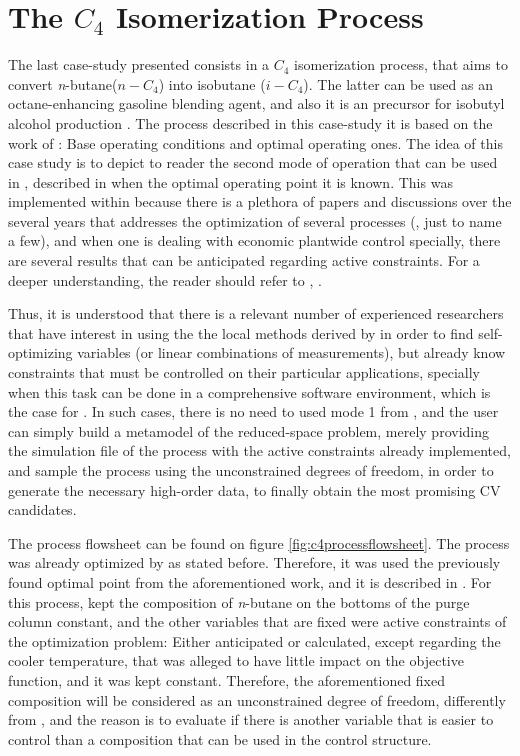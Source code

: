 \documentclass[../../msc-thesis.tex]{subfiles}
\begin{document}
\section{The $C_{4}$ Isomerization Process}

The last case-study presented consists in a $C_{4}$ isomerization process, 
that aims to convert \textit{n}-butane($n-C_{4}$) into isobutane ($i-C_{4}$). 
The latter can be used as an octane-enhancing gasoline blending agent, and 
also it is an precursor for isobutyl alcohol production 
\textcite{Jagtap2012}. The process described in this case-study it is based 
on the work of \cite{Jagtap2012}: Base operating conditions and optimal 
operating ones. The idea of this case study is to depict to reader the second
mode of operation that can be used in \mtc, described in 
 when the optimal operating point it is known. 
This was implemented within \mtc because there is a plethora of papers and 
discussions over the several years that addresses the optimization of several
processes (\cite{Jagtap2012,Jagtap2013,Araujo2007,Araujo2008,Gera2013,Liu2019,
Skogestad2004}, just to name a few), and when one is dealing with economic 
plantwide control specially, there are several results that can be anticipated 
regarding active constraints. For a deeper understanding, the reader should 
refer to , . 

Thus, it is understood that there is a relevant number of experienced 
researchers that have interest in using the the local methods derived by 
\textcite{Halvorsen2003,Alstad2009} in order to find self-optimizing variables 
(or linear combinations of measurements), but already know constraints that 
must be controlled on their particular applications, specially when this task 
can be done in a comprehensive software environment, which is the case for
\mtc. In such cases, there is no need to used mode 1 from \mtc, and the user 
can simply build a metamodel of the reduced-space problem, merely providing 
the simulation file of the process with the active constraints already 
implemented, and sample the process using the unconstrained degrees of 
freedom, in order to generate the necessary high-order data, to finally 
obtain the most promising CV candidates.

The process flowsheet can be found on figure \ref{fig:c4processflowsheet}. 
The process was already optimized by \textcite{Jagtap2012} as stated before. 
Therefore, it was used the previously found optimal point from the 
aforementioned work, and it is described in . For this 
process, \textcite{Jagtap2012} kept the composition of \textit{n}-butane on 
the bottoms of the purge column constant, and the other variables that are 
fixed were active constraints of the optimization problem: Either anticipated 
or calculated, except regarding the cooler temperature, that was alleged to 
have little impact on the objective function, and it was kept constant. 
Therefore, the aforementioned fixed composition will be considered as an 
unconstrained degree of freedom, differently from \textcite{Jagtap2012}, 
and the reason is to evaluate if there is another variable that is easier 
to control than a composition that can be used in the control structure.
\end{document}
